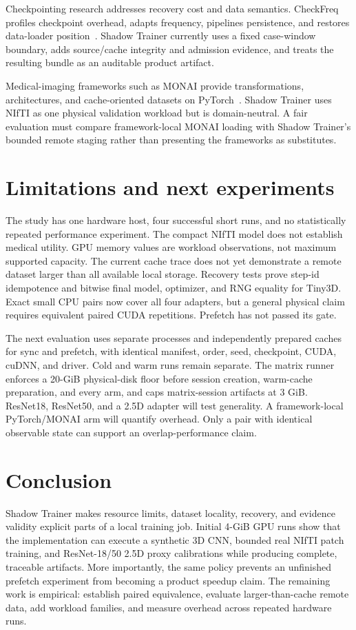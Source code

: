 \documentclass[10pt,twocolumn]{article}
\begin{document}
Checkpointing research addresses recovery cost and data semantics. CheckFreq
profiles checkpoint overhead, adapts frequency, pipelines persistence, and
restores data-loader position~\cite{checkfreq}. Shadow Trainer currently uses a
fixed case-window boundary, adds source/cache integrity and admission evidence,
and treats the resulting bundle as an auditable product artifact.

Medical-imaging frameworks such as MONAI provide transformations, architectures,
and cache-oriented datasets on PyTorch~\cite{monai}. Shadow Trainer uses NIfTI
as one physical validation workload but is domain-neutral. A fair evaluation
must compare framework-local MONAI loading with Shadow Trainer's bounded remote
staging rather than presenting the frameworks as substitutes.

\section{Limitations and next experiments}

The study has one hardware host, four successful short runs, and no statistically
repeated performance experiment. The compact NIfTI model does not establish
medical utility. GPU memory values are workload observations, not maximum
supported capacity. The current cache trace does not yet demonstrate a remote
dataset larger than all available local storage. Recovery tests prove step-id idempotence and bitwise final model, optimizer, and
RNG equality for Tiny3D. Exact small CPU pairs now cover all four adapters, but
a general physical claim requires equivalent paired CUDA repetitions. Prefetch has not passed its gate.

The next evaluation uses separate processes and independently prepared caches
for sync and prefetch, with identical manifest, order, seed, checkpoint, CUDA,
cuDNN, and driver. Cold and warm runs remain separate. The matrix runner enforces a 20-GiB physical-disk floor before session creation,
warm-cache preparation, and every arm, and caps matrix-session artifacts at 3 GiB. ResNet18, ResNet50,
and a 2.5D adapter will test generality. A framework-local PyTorch/MONAI arm
will quantify overhead. Only a pair with identical observable state can support
an overlap-performance claim.

\section{Conclusion}

Shadow Trainer makes resource limits, dataset locality, recovery, and evidence
validity explicit parts of a local training job. Initial 4-GiB GPU runs show
that the implementation can execute a synthetic 3D CNN, bounded real NIfTI
patch training, and ResNet-18/50 2.5D proxy calibrations while producing complete, traceable artifacts. More importantly,
the same policy prevents an unfinished prefetch experiment from becoming a
product speedup claim. The remaining work is empirical: establish paired
equivalence, evaluate larger-than-cache remote data, add workload families, and
measure overhead across repeated hardware runs.



\end{document}
